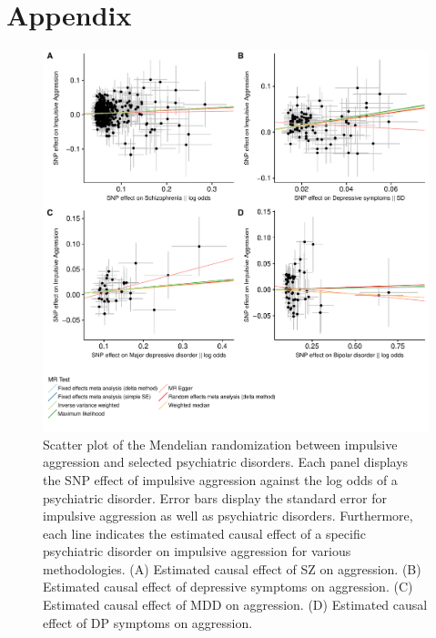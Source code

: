 \section{Appendix}
\label{sec:appendix}

\begin{figure}[htpb]
  \centering
  \includegraphics[width=0.7\linewidth]{ukb_psychiatric/figures/mr_aggression.pdf}
  \caption[Scatter Plot of the Causal Effects on Aggression]{
    Scatter plot of the Mendelian randomization between impulsive aggression and selected psychiatric disorders.
    Each panel displays the SNP effect of impulsive aggression against the log odds of a psychiatric disorder.
    Error bars display the standard error for impulsive aggression as well as psychiatric disorders.
    Furthermore, each line indicates the estimated causal effect of a specific psychiatric disorder on impulsive aggression for various methodologies.
    (A) Estimated causal effect of SZ on aggression.
    (B) Estimated causal effect of depressive symptoms on aggression.
    (C) Estimated causal effect of MDD on aggression.
    (D) Estimated causal effect of DP symptoms on aggression.
  }\label{fig:mr_aggression}
\end{figure}

